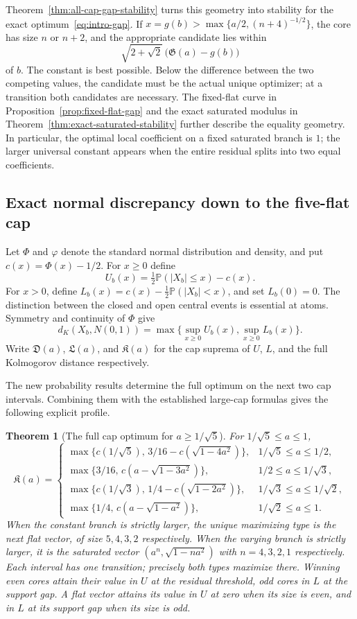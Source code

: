 \documentclass[11pt]{article}
\newtheorem{theorem}{Theorem}[section]
\theoremstyle{remark}\newtheorem{remark}[theorem]{Remark}
\newcommand{\Pp}{\mathbb P}
\begin{document}
Theorem~\ref{thm:all-cap-gap-stability} turns this geometry into stability
for the exact optimum~\eqref{eq:intro-gap}. If
$x=g(b)>\max\{a/2,(n+4)^{-1/2}\}$, the core has size $n$ or $n+2$,
and the appropriate candidate lies within
\[
 \sqrt{2+\sqrt2}\,\bigl(\mathfrak G(a)-g(b)\bigr)
\]
of $b$. The constant is best possible. Below the difference between the
two competing values, the candidate must be the actual unique optimizer;
at a transition both candidates are necessary. The fixed-flat curve in
Proposition~\ref{prop:fixed-flat-gap} and the exact saturated modulus in
Theorem~\ref{thm:exact-saturated-stability} further describe the equality
geometry. In particular, the optimal local coefficient on a fixed
saturated branch is $1$; the larger universal constant appears when the
entire residual splits into two equal coefficients.

\subsection{Exact normal discrepancy down to the five-flat cap}
Let $\Phi$ and $\varphi$ denote the standard normal distribution and
density, and put $c(x)=\Phi(x)-1/2$. For $x\ge0$ define
\[
 U_b(x)=\tfrac12\Pp(|X_b|\le x)-c(x).
\]
For $x>0$, define
$L_b(x)=c(x)-\tfrac12\Pp(|X_b|<x)$, and set $L_b(0)=0$.
The distinction between the closed and open central events is essential
at atoms. Symmetry and continuity of $\Phi$ give
\[
 d_K(X_b,N(0,1))=\max\{\sup_{x\ge0}U_b(x),\sup_{x\ge0}L_b(x)\}.
\]
Write $\mathfrak D(a)$, $\mathfrak L(a)$, and $\mathfrak K(a)$ for the
cap suprema of $U$, $L$, and the full Kolmogorov distance respectively.

The new probability results determine the full optimum on the next two
cap intervals. Combining them with the established large-cap formulas
gives the following explicit profile.

\begin{theorem}[The full cap optimum for $a\ge1/\sqrt5$]
\label{thm:full-cap-profile}
For $1/\sqrt5\le a\le1$,
\begin{equation}\label{eq:full-cap-profile}
\mathfrak K(a)=
\begin{cases}
\max\{c(1/\sqrt5),\,3/16-c(\sqrt{1-4a^2})\},
 &1/\sqrt5\le a\le1/2,\\[2pt]
\max\{3/16,\,c(a-\sqrt{1-3a^2})\},
 &1/2\le a\le1/\sqrt3,\\[2pt]
\max\{c(1/\sqrt3),\,1/4-c(\sqrt{1-2a^2})\},
 &1/\sqrt3\le a\le1/\sqrt2,\\[2pt]
\max\{1/4,\,c(a-\sqrt{1-a^2})\},
 &1/\sqrt2\le a\le1.
\end{cases}
\end{equation}
When the constant branch is strictly larger, the unique maximizing type
is the next flat vector, of size $5,4,3,2$ respectively. When the varying
branch is strictly larger, it is the saturated vector
$(a^n,\sqrt{1-na^2})$ with $n=4,3,2,1$ respectively. Each interval
has one transition; precisely both types maximize there.
Winning even cores attain their value in $U$ at
the residual threshold, odd cores in $L$ at the support gap. A flat
vector attains its value in $U$ at zero when its size is even, and
in $L$ at its support gap when its size is odd.
\end{theorem}
\end{document}
